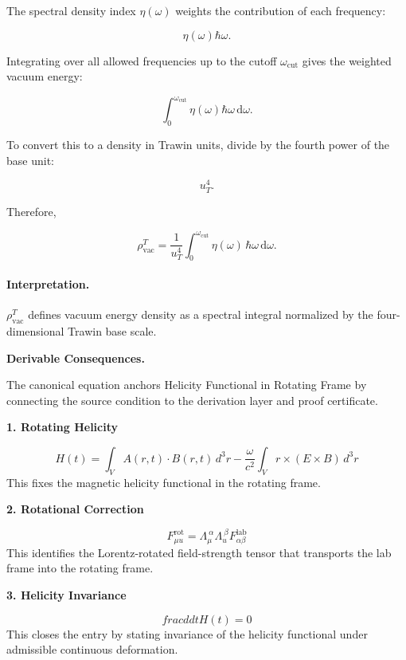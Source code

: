 The spectral density index $\eta(\omega)$ weights the contribution of each frequency:

\begin{equation}
\eta(\omega)\hbar\omega .
\end{equation}

Integrating over all allowed frequencies up to the cutoff $\omega_{\mathrm{cut}}$ gives the weighted vacuum energy:

\begin{equation}
\int_{0}^{\omega_{\mathrm{cut}}}
\eta(\omega)\hbar\omega\,\mathrm{d}\omega .
\end{equation}

To convert this to a density in Trawin units, divide by the fourth power of the base unit:

\begin{equation}
u_T^4 .
\end{equation}

Therefore,

\begin{equation}
\boxed{
\rho_{\mathrm{vac}}^{T}
=
\frac{1}{u_T^4}
\int_{0}^{\omega_{\mathrm{cut}}}
\eta(\omega)\,
\hbar\omega\,
\mathrm{d}\omega .
}
\end{equation}

\paragraph{Interpretation.}
$\rho_{\mathrm{vac}}^{T}$ defines vacuum energy density as a spectral integral normalized by the four-dimensional Trawin base scale.

\par\vspace{0.35em}
\noindent\textbf{Derivable Consequences.}\quad
\begingroup
\footnotesize
\raggedright
The canonical equation anchors Helicity Functional in Rotating Frame by connecting the source condition to the derivation layer and proof certificate.
\par\endgroup

\noindent\textbf{1. Rotating Helicity}\par
\[
H(t)=\int_V A(r,t)\cdot B(r,t)\,d^3r-\frac{\omega}{c^2}\int_V r\times(E\times B)\,d^3r
\]
\noindent This fixes the magnetic helicity functional in the rotating frame.\par
\noindent\textbf{2. Rotational Correction}\par
\[
F^{\mathrm{rot}}_{\mu u}=\Lambda_{\mu}^{\ \alpha}\Lambda_{ u}^{\ \beta}F^{\mathrm{lab}}_{\alpha\beta}
\]
\noindent This identifies the Lorentz-rotated field-strength tensor that transports the lab frame into the rotating frame.\par
\noindent\textbf{3. Helicity Invariance}\par
\[
frac{d}{dt}H(t)=0
\]
\noindent This closes the entry by stating invariance of the helicity functional under admissible continuous deformation.\par

